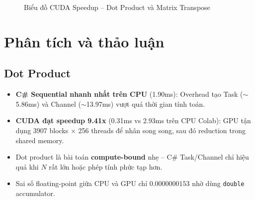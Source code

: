 \documentclass[12pt,a4paper]{article}
\begin{document}
\begin{figure}[H]
\centering
{}
\caption{Biểu đồ CUDA Speedup -- Dot Product và Matrix Transpose}
\end{figure}

\section{Phân tích và thảo luận}

\subsection{Dot Product}
\begin{itemize}
    \item \textbf{C\# Sequential nhanh nhất trên CPU} (1.90ms): Overhead tạo Task ($\sim$5.86ms) và Channel ($\sim$13.97ms) vượt quá thời gian tính toán.
    \item \textbf{CUDA đạt speedup 9.41x} (0.31ms vs 2.93ms trên CPU Colab): GPU tận dụng 3907 blocks $\times$ 256 threads để nhân song song, sau đó reduction trong shared memory.
    \item Dot product là bài toán \textbf{compute-bound} nhẹ -- C\# Task/Channel chỉ hiệu quả khi $N$ rất lớn hoặc phép tính phức tạp hơn.
    \item Sai số floating-point giữa CPU và GPU chỉ $0.0000000153$ nhờ dùng \texttt{double} accumulator.
\end{itemize}
\end{document}
